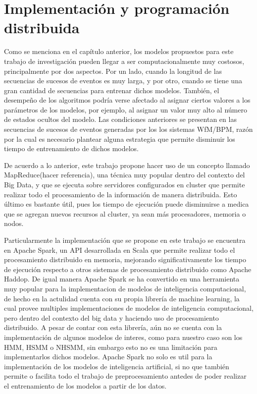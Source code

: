 
\chapter{Implementación y programación distribuida}

\ifpdf
    \graphicspath{{Chapter4/Figs/Raster/}{Chapter4/Figs/PDF/}{Chapter4/Figs/}}
\else
    \graphicspath{{Chapter4/Figs/Vector/}{Chapter4/Figs/}}
\fi

Como se menciona en el capítulo anterior, los modelos propuestos para este trabajo de investigación pueden llegar a ser computacionalmente muy costosos, principalmente por dos aspectos. Por un lado, cuando la longitud de las secuencias de sucesos de eventos es muy larga, y por otro, cuando se tiene una gran cantidad de secuencias para entrenar dichos modelos. También, el desempeño de los algoritmos podría verse afectado al asignar ciertos valores a los parámetros de los modelos, por ejemplo, al asignar un valor muy alto al número de estados ocultos del modelo. Las condiciones anteriores se presentan en las secuencias de sucesos de eventos generadas por los los sistemas WfM/BPM, razón por la cual es necesario plantear alguna estrategia que permite disminuir los tiempo de entrenamiento de dichos modelos.

De acuerdo a lo anterior, este trabajo propone hacer uso de un concepto llamado MapReduce(hacer referencia), una técnica muy popular dentro del contexto del Big Data, y que se ejecuta sobre servidores configurados en cluster que permite realizar todo el procesamiento de la información de manera distribuida. Esto último es bastante útil, pues los tiempo de ejecución puede disminuirse a medica que se agregan nuevos recursos al cluster, ya sean más procesadores, memoria o nodos. 

Particularmente la implementación que se propone en este trabajo se encuentra en Apache Spark, un API desarrollada en Scala que permite realizar todo el procesamiento distribuido en memoria, mejorando significativamente los tiempo de ejecución respecto a otros sistemas de procesamiento distribuido como Apache Haddop. De igual manera Apache Spark se ha convertido en una herramienta muy popular para la implementacion de modelos de inteligencia computacional, de hecho en la actulidad cuenta con su propia librería de machine learning, la cual provee multiples implementaciones de modelos de inteligencia computacional, pero dentro del contexto del big data y haciendo uso de procesamiento distribuido. A pesar de contar con esta librería, aún no se cuenta con la implementación de algunos modelos de interes, como para nuestro caso son los HMM, HSMM o NHSMM, sin embargo esto no es una limitación para implementarlos dichos modelos. Apache Spark no solo es util para la implementación de los modelos de inteligencia artificial, si no que también permite o facilita todo el trabajo de preprocesamiento antedes de poder realizar el entrenamiento de los modelos a partir de los datos.

